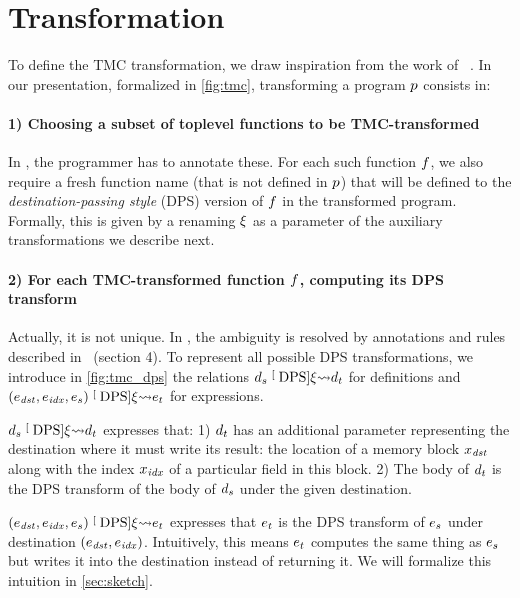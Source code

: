\section{Transformation}

To define the TMC transformation, we draw inspiration from the work of \citeauthor{DBLP:journals/corr/abs-2102-09823}~\cite{DBLP:journals/corr/abs-2102-09823}.
In our presentation, formalized in \cref{fig:tmc}, transforming a program $\datalangProg$ consists in:

\paragraph{1) Choosing a subset of toplevel functions to be TMC-transformed}
In \OCaml, the programmer has to annotate these.
For each such function $\datalangFn$, we also require a fresh function name (that is not defined in $\datalangProg$) that will be defined to the \emph{destination-passing style} (DPS) version of $\datalangFn$ in the transformed program.
Formally, this is given by a renaming $\xi$ as a parameter of the auxiliary transformations we describe next.

\paragraph{2) For each TMC-transformed function $\datalangFn$, computing its DPS transform}
Actually, it is not unique.
In \OCaml, the ambiguity is resolved by annotations and rules described in~\cite{DBLP:journals/corr/abs-2102-09823} (section 4).
To represent all possible DPS transformations, we introduce in \cref{fig:tmc_dps} the relations $\datalangDef_s \tmcDps{\datalangRenaming} \datalangDef_t$ for definitions and $(\datalangExpr_\mathit{dst}, \datalangExpr_\mathit{idx}, \datalangExpr_s) \tmcDps{\datalangRenaming} \datalangExpr_t$ for expressions.

$\datalangDef_s \tmcDps{\datalangRenaming} \datalangDef_t$ expresses that:
1) $\datalangDef_t$ has an additional parameter representing the destination where it must write its result: the location of a memory block $\datalangVar_\mathit{dst}$ along with the index $\datalangVar_\mathit{idx}$ of a particular field in this block.
2) The body of $\datalangDef_t$ is the DPS transform of the body of $\datalangDef_s$ under the given destination.

$(\datalangExpr_\mathit{dst}, \datalangExpr_\mathit{idx}, \datalangExpr_s) \tmcDps{\datalangRenaming} \datalangExpr_t$ expresses that $\datalangExpr_t$ is the DPS transform of $\datalangExpr_s$ under destination $(\datalangExpr_\mathit{dst}, \datalangExpr_\mathit{idx})$.
Intuitively, this means $\datalangExpr_t$ computes the same thing as $\datalangExpr_s$ but writes it into the destination instead of returning it.
We will formalize this intuition in \cref{sec:sketch}.

